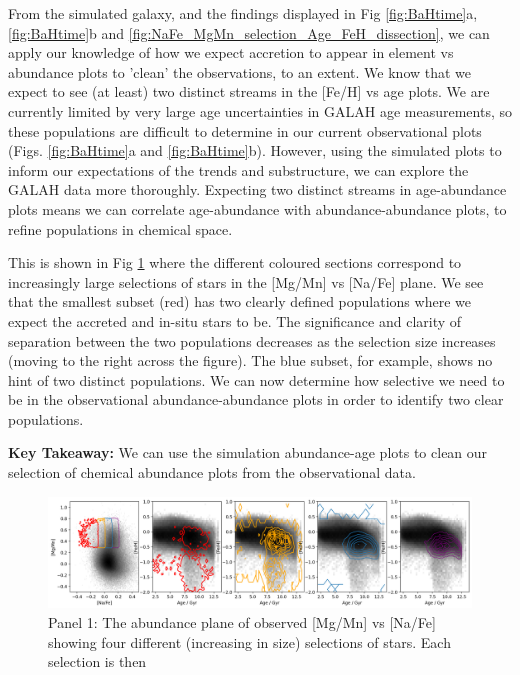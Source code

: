 \documentclass[fleqn,usenatbib]{mnras}
\begin{document}

From the simulated galaxy, and the findings displayed in Fig \ref{fig:BaHtime}a, \ref{fig:BaHtime}b and \ref{fig:NaFe_MgMn_selection_Age_FeH_dissection}, we can apply our knowledge of how we expect accretion to appear in element vs abundance plots to 'clean' the observations, to an extent. We know that we expect to see (at least) two distinct streams in the [Fe/H] vs age plots. We are currently limited by very large age uncertainties in GALAH age measurements, so these populations are difficult to determine in our current observational plots (Figs. \ref{fig:BaHtime}a and \ref{fig:BaHtime}b). However, using the simulated plots to inform our expectations of the trends and substructure, we can explore the GALAH data more thoroughly. Expecting two distinct streams in age-abundance plots means we can correlate age-abundance  with abundance-abundance plots, to refine populations in chemical space. \par 
This is shown in Fig \ref{fig:NaFe_MgMn_selection_Age_FeH} where the different coloured sections correspond to increasingly large selections of stars in the [Mg/Mn] vs [Na/Fe] plane. We see that the smallest subset (red) has two clearly defined populations where we expect the accreted and in-situ stars to be. The significance and clarity of separation between the two populations decreases as the selection size increases (moving to the right across the figure). The blue subset, for example, shows no hint of two distinct populations. We can now determine how selective we need to be in the observational abundance-abundance plots in order to identify two clear populations. \par 
\textbf{Key Takeaway:} We can use the simulation abundance-age plots to clean our selection of chemical abundance plots from the observational data. 


\begin{figure}
	\includegraphics[width=\textwidth]{figures/NaFe_MgMn_selection_Age_FeH.png}
    \caption{Panel 1: The abundance plane of observed [Mg/Mn] vs [Na/Fe] showing four different (increasing in size) selections of stars. Each selection is then }
    \label{fig:NaFe_MgMn_selection_Age_FeH}
\end{figure}
\end{document}
